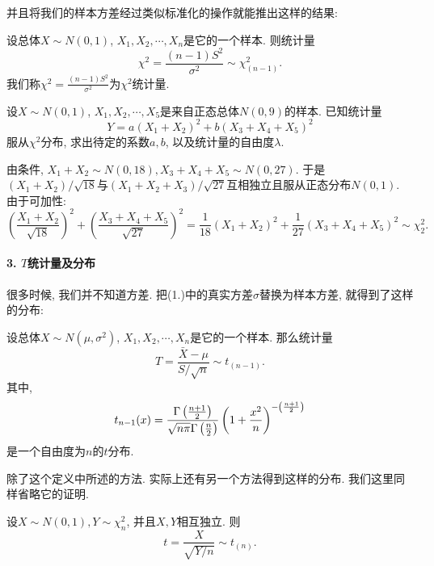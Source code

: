 并且将我们的样本方差经过类似标准化的操作就能推出这样的结果: 

\begin{theorem}
    设总体$X\sim N(0, 1)$, $X_1, X_2, \cdots, X_n$是它的一个样本. 则统计量
    $$
    \chi^2 = \frac{(n-1)S^2}{\sigma^2}\sim \chi^2_{(n-1)}.
    $$ 
    我们称$\chi^2=\frac{(n-1)S^2}{\sigma^2}$为$\chi^2$统计量. 
\end{theorem}

\begin{example}
    设$X\sim N(0, 1)$, $X_1, X_2, \cdots, X_5$是来自正态总体$N(0, 9)$的样本. 已知统计量
    $$
    Y=a(X_1+X_2)^2 +b(X_3+X_4+X_5)^2
    $$
    服从$\chi^2$分布, 求出待定的系数$a,b$, 以及统计量的自由度$\lambda$. 
\end{example}

\begin{solution}
    由条件, $X_1+X_2\sim N(0, 18), X_3+X_4+X_5\sim N(0, 27)$. 于是$(X_1+X_2)/\sqrt{18}$与$(X_1+X_2+X_3)/\sqrt{27}$互相独立且服从正态分布$N(0,1 )$. 由于可加性: 
    $$
    \left(
        \frac{X_1+X_2}{\sqrt{18}}
    \right)^2 + 
    \left(
        \frac{X_3+X_4+X_5}{\sqrt{27}}
    \right)^2 = 
    \frac{1}{18}(X_1+X_2)^2+\frac 1{27}(X_3+X_4+X_5)^2\sim \chi^2_2.
    $$
\end{solution}

\paragraph{3. $T$统计量及分布}

很多时候, 我们并不知道方差. 把(1.)中的真实方差$\sigma$替换为样本方差, 就得到了这样的分布: 

\begin{definition}
    设总体$X\sim N(\mu, \sigma^2)$, $X_1, X_2, \cdots, X_n$是它的一个样本. 那么统计量
    $$
    T = \frac{\bar X-\mu }{S/\sqrt n} \sim t_{(n-1)}.
    $$
    其中, 
    $$
    t_{n-1}(x)=
    \frac{
        \Gamma \left(
            \frac{n+1}{2}
        \right)
    }{
        \sqrt{n\pi} \Gamma \left(\frac n2\right)
    }\left(
        1+\frac{x^2}{n}
    \right)^{-\left(
        n+1\over 2
    \right)}
    $$是一个自由度为$n$的$t$分布. 
\end{definition}

除了这个定义中所述的方法. 实际上还有另一个方法得到这样的分布. 我们这里同样省略它的证明. 

\begin{theorem}
    设$X\sim N(0, 1), Y\sim \chi^2_n$, 并且$X, Y$相互独立. 则
    $$
    t=\frac{X}{\sqrt{Y/n}} \sim t_{(n)}.
    $$
\end{theorem}

